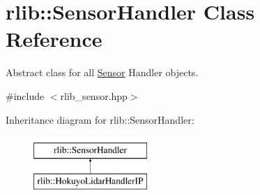\hypertarget{classrlib_1_1SensorHandler}{\section{rlib\-:\-:Sensor\-Handler Class Reference}
\label{classrlib_1_1SensorHandler}
}


Abstract class for all \hyperlink{classrlib_1_1Sensor}{Sensor} Handler objects.  




{\ttfamily \#include $<$rlib\-\_\-sensor.\-hpp$>$}

Inheritance diagram for rlib\-:\-:Sensor\-Handler\-:\begin{figure}[H]
\begin{center}
\leavevmode
\includegraphics[height=2.000000cm]{classrlib_1_1SensorHandler}
\end{center}
\end{figure}

